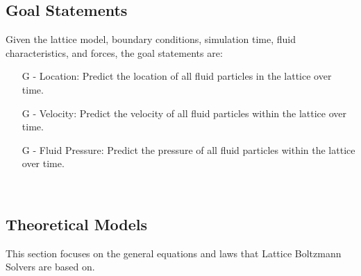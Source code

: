 \documentclass[12pt]{article}
\newcounter{goalnum} %
\newcommand{\famname}{Lattice Boltzmann Solvers} %
\begin{document}


\subsection{Goal Statements}
\label{goalstatements}
\noindent Given the lattice model, boundary conditions, simulation time, fluid characteristics, and forces, the goal statements are:

\begin{itemize}

\item[G\refstepcounter{goalnum}\thegoalnum \label{G_Location} -]Location: Predict the location of all fluid particles in the lattice over time.

\item[G\refstepcounter{goalnum}\thegoalnum \label{G_Velocity} -]Velocity: Predict the velocity of all fluid particles within the lattice over time.

\item[G\refstepcounter{goalnum}\thegoalnum \label{G_FluidPressure} -]Fluid Pressure: Predict the pressure of all fluid particles within the lattice over time.

\end{itemize}

~\newpage

\subsection{Theoretical Models} \label{sec_theoretical}

This section focuses on the general equations and laws that \famname{} are based
on.  

~\newline
\end{document}
